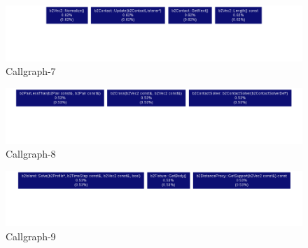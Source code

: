 \documentclass[12pt, a4paper]{article}
\begin{document}
\begin{figure}[H]
\caption{Callgraph-7}
\centering
\includegraphics[width=1.05\textwidth]{7.png}
\end{figure}
\begin{figure}[H]
\caption{Callgraph-8}
\centering
\includegraphics[width=1.05\textwidth]{8.png}
\end{figure}
\begin{figure}[H]
\caption{Callgraph-9}
\centering
\includegraphics[width=1.05\textwidth]{9.png}
\end{figure}


\pagebreak 
\end{document}

